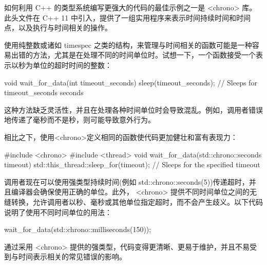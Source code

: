 如何利用 C++ 的类型系统编写更强大的代码的最佳示例之一是 <chrono> 库。此头文件在 C++ 11 中引入，提供了一组实用程序来表示时间持续时间和时间点，以及执行与时间相关的操作。

使用纯整数或诸如 timespec 之类的结构，来管理与时间相关的函数可能是一种容易出错的方法，尤其是在处理不同的时间单位时。试想一下，一个函数接受一个表示以秒为单位的超时时间的整数：

\begin{cpp}
void wait_for_data(int timeout_seconds) {
    sleep(timeout_seconds); // Sleeps for timeout_seconds seconds
}
\end{cpp}

这种方法缺乏灵活性，并且在处理各种时间单位时会导致混乱。例如，调用者错误地传递了毫秒而不是秒，则可能导致意外行为。

相比之下，使用<chrono>定义相同的函数使代码更加健壮和富有表现力：

\begin{cpp}
#include <chrono>
#include <thread>
void wait_for_data(std::chrono::seconds timeout) {
    std::this_thread::sleep_for(timeout); // Sleeps for the specified timeout
}
\end{cpp}

调用者现在可以使用强类型持续时间(例如 std::chrono::seconds(5))传递超时，并且编译器会确保使用正确的单位。此外， <chrono> 提供不同时间单位之间的无缝转换，允许调用者以秒、毫秒或其他单位指定超时，而不会产生歧义。以下代码说明了使用不同时间单位的用法：

\begin{cpp}
wait_for_data(std::chrono::milliseconds(150));
\end{cpp}

通过采用 <chrono> 提供的强类型，代码变得更清晰、更易于维护，并且不易受到与时间表示相关的常见错误的影响。


